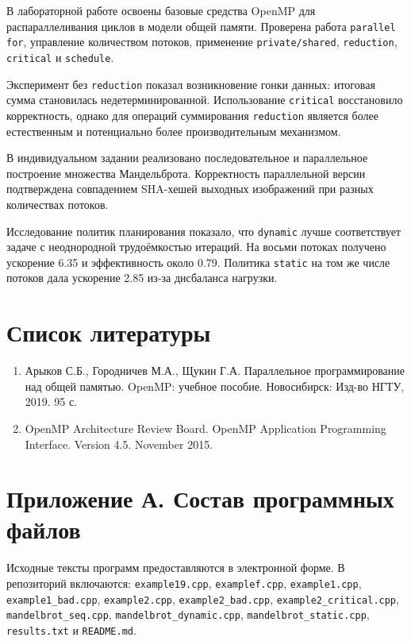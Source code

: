 \documentclass[12pt,a4paper]{article}
\begin{document}
В лабораторной работе освоены базовые средства OpenMP для распараллеливания циклов в модели общей памяти. Проверена работа \texttt{parallel for}, управление количеством потоков, применение \texttt{private/shared}, \texttt{reduction}, \texttt{critical} и \texttt{schedule}.

Эксперимент без \texttt{reduction} показал возникновение гонки данных: итоговая сумма становилась недетерминированной. Использование \texttt{critical} восстановило корректность, однако для операций суммирования \texttt{reduction} является более естественным и потенциально более производительным механизмом.

В индивидуальном задании реализовано последовательное и параллельное построение множества Мандельброта. Корректность параллельной версии подтверждена совпадением SHA-хешей выходных изображений при разных количествах потоков.

Исследование политик планирования показало, что \texttt{dynamic} лучше соответствует задаче с неоднородной трудоёмкостью итераций. На восьми потоках получено ускорение 6.35 и эффективность около 0.79. Политика \texttt{static} на том же числе потоков дала ускорение 2.85 из-за дисбаланса нагрузки.

\section*{Список литературы}

\begin{enumerate}
\item Арыков С.Б., Городничев М.А., Щукин Г.А. Параллельное программирование над общей памятью. OpenMP: учебное пособие. Новосибирск: Изд-во НГТУ, 2019. 95 с.
\item OpenMP Architecture Review Board. OpenMP Application Programming Interface. Version 4.5. November 2015.
\end{enumerate}

\section*{Приложение А. Состав программных файлов}

Исходные тексты программ предоставляются в электронной форме. В репозиторий включаются:
\texttt{example19.cpp}, \texttt{examplef.cpp}, \texttt{example1.cpp}, \texttt{example1\_bad.cpp}, \texttt{example2.cpp}, \texttt{example2\_bad.cpp}, \texttt{example2\_critical.cpp}, \texttt{mandelbrot\_seq.cpp}, \texttt{mandelbrot\_dynamic.cpp}, \texttt{mandelbrot\_static.cpp}, \texttt{results.txt} и \texttt{README.md}.
\end{document}
